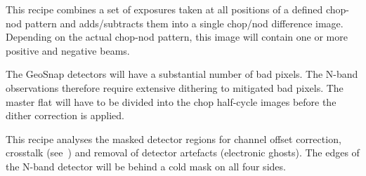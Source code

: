 This recipe combines a set of exposures taken at all positions of a
defined chop-nod pattern and adds/subtracts them into a single
chop/nod difference image. Depending on the actual chop-nod pattern,
this image will contain one or more positive and negative beams.

The GeoSnap detectors will have a substantial number of bad pixels.
The N-band observations therefore require extensive dithering to mitigated bad pixels.
The master flat will have to be divided into the chop half-cycle images before the dither correction is applied.

This recipe analyses the masked detector regions for channel offset correction, crosstalk (see~\cite{matisse_minutes}) and removal of detector artefacts (electronic ghosts).
The edges of the N-band detector will be behind a cold mask on all four sides.


